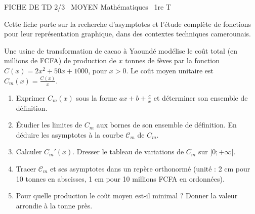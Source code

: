 \documentclass[11pt]{article}
\begin{document}
\begin{tcolorbox}[enhanced,colback=popink,colframe=popink,arc=10pt,boxrule=0pt,left=12pt,right=12pt,top=9pt,bottom=9pt]
{\color{white}\popxbold\small FICHE DE TD 2/3 \textbullet\ MOYEN \hfill Mathématiques \textbullet\ 1re T\par}
\end{tcolorbox}
\vspace{4pt}
Cette fiche porte sur la recherche d'asymptotes et l'étude complète de fonctions pour leur représentation graphique, dans des contextes techniques camerounais.

\begin{exercice}
Une usine de transformation de cacao à Yaoundé modélise le coût total (en millions de FCFA) de production de $x$ tonnes de fèves par la fonction $C(x) = 2x^2 + 50x + 1000$, pour $x > 0$. Le coût moyen unitaire est $C_m(x) = \frac{C(x)}{x}$.
\begin{enumerate}
    \item Exprimer $C_m(x)$ sous la forme $ax + b + \frac{c}{x}$ et déterminer son ensemble de définition.
    \item Étudier les limites de $C_m$ aux bornes de son ensemble de définition. En déduire les asymptotes à la courbe $\mathcal{C}_m$ de $C_m$.
    \item Calculer $C_m'(x)$. Dresser le tableau de variations de $C_m$ sur $]0; +\infty[$.
    \item Tracer $\mathcal{C}_m$ et ses asymptotes dans un repère orthonormé (unité : 2 cm pour 10 tonnes en abscisses, 1 cm pour 10 millions FCFA en ordonnées).
    \item Pour quelle production le coût moyen est-il minimal ? Donner la valeur arrondie à la tonne près.
\end{enumerate}
\end{exercice}
\end{document}
